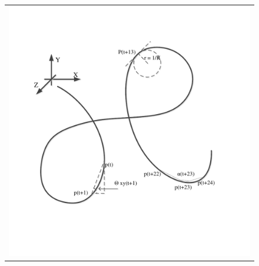 \begin{figure}[!t]
\centering
\vspace{-10mm}
\begin{tabular}{c}
\includegraphics[width=0.9\columnwidth]{./Graphic/Pictures/slopeangle.pdf}
\end{tabular}\vspace{-18mm}
\caption{{} \vspace{-2mm}}
\label{fig:curvature}
\end{figure}




